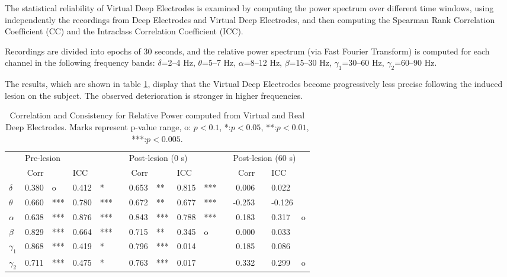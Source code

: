 \documentclass[draftcls, onecolumn, peerreview]{IEEEtran}
\begin{document}
The statistical reliability of Virtual Deep Electrodes is examined by computing the power spectrum over different time windows, using independently the recordings from Deep Electrodes and Virtual Deep Electrodes, and then computing the Spearman Rank Correlation Coefficient (CC) and the Intraclass Correlation Coefficient (ICC).

Recordings are divided into epochs of 30 seconds, and the relative power spectrum (via Fast Fourier Transform) is computed for each channel in the following frequency bands:
{$\delta$=2--4 Hz}, {$\theta$=5--7 Hz}, {{$\alpha$=8--12 Hz}}, {$\beta$=15--30 Hz}, {$\gamma_1$=30--60 Hz}, {$\gamma_2$=60--90 Hz}.

The results, which are shown in table \ref{tab:icc_relative}, display that the Virtual Deep Electrodes become progressively less precise following the induced lesion on the subject. 
%
The observed deterioration is stronger in higher frequencies.

\begin{table}[!t]
\renewcommand{\arraystretch}{1.3}
\caption{Correlation and Consistency for Relative Power computed from Virtual and Real Deep Electrodes. Marks represent p-value range, o: $p<0.1$, *:$p<0.05$, **:$p<0.01$, ***:$p<0.005$.}
\centering
\begin{tabular}{@{}lrllllrllllrlll@{}}
\toprule
       & \multicolumn{4}{l}{Pre-lesion} &  & \multicolumn{4}{l}{Post-lesion (0 s)}  &  & \multicolumn{4}{l}{Post-lesion (60 s)} \\
       \cmidrule(l){2-5} 
       \cmidrule(l){7-10}
       \cmidrule(l){12-15} 
       & Corr   &      & ICC   &     &  & Corr  &     & ICC   &     &  & Corr     &   & ICC     &   \\ 
       \midrule 
$\delta$
& 0.380  & o    & 0.412 & *   &  & 0.653 & **  & 0.815 & *** &  & 0.006    &   & 0.022   &    \\
$\theta$  
& 0.660  & ***  & 0.780 & *** &  & 0.672 & **  & 0.677 & *** &  & -0.253   &   & -0.126  &    \\
$\alpha$  
& 0.638  & ***  & 0.876 & *** &  & 0.843 & *** & 0.788 & *** &  & 0.183    &   & 0.317   & o  \\
$\beta$   
& 0.829  & ***  & 0.664 & *** &  & 0.715 & **  & 0.345 & o   &  & 0.000    &   & 0.033   &    \\
$\gamma_1$ 
& 0.868  & ***  & 0.419 & *   &  & 0.796 & *** & 0.014 &     &  & 0.185    &   & 0.086   &    \\
$\gamma_2$ 
& 0.711  & ***  & 0.475 & *   &  & 0.763 & *** & 0.017 &     &  & 0.332    &   & 0.299   & o \\
\bottomrule
\end{tabular}
\label{tab:icc_relative}
\end{table}
\end{document}
